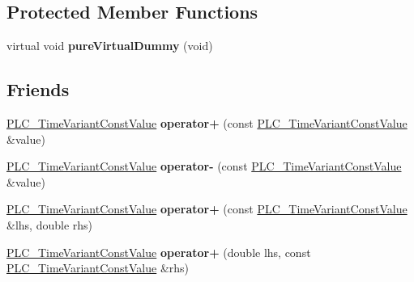 \subsection*{\-Protected \-Member \-Functions}
\begin{DoxyCompactItemize}
\item 
\hypertarget{classns3_1_1PLC__TimeVariantConstValue_a9bf67ac73617b8fe68424bbaa16216c5}{virtual void {\bfseries pure\-Virtual\-Dummy} (void)}\label{classns3_1_1PLC__TimeVariantConstValue_a9bf67ac73617b8fe68424bbaa16216c5}

\end{DoxyCompactItemize}
\subsection*{\-Friends}
\begin{DoxyCompactItemize}
\item 
\hypertarget{classns3_1_1PLC__TimeVariantConstValue_a18abf5ad9ce5544205a3df9ab595a4d3}{\hyperlink{classns3_1_1PLC__TimeVariantConstValue}{\-P\-L\-C\-\_\-\-Time\-Variant\-Const\-Value} {\bfseries operator+} (const \hyperlink{classns3_1_1PLC__TimeVariantConstValue}{\-P\-L\-C\-\_\-\-Time\-Variant\-Const\-Value} \&value)}\label{classns3_1_1PLC__TimeVariantConstValue_a18abf5ad9ce5544205a3df9ab595a4d3}

\item 
\hypertarget{classns3_1_1PLC__TimeVariantConstValue_a68bb3e707836681264d3475bdf3139d8}{\hyperlink{classns3_1_1PLC__TimeVariantConstValue}{\-P\-L\-C\-\_\-\-Time\-Variant\-Const\-Value} {\bfseries operator-\/} (const \hyperlink{classns3_1_1PLC__TimeVariantConstValue}{\-P\-L\-C\-\_\-\-Time\-Variant\-Const\-Value} \&value)}\label{classns3_1_1PLC__TimeVariantConstValue_a68bb3e707836681264d3475bdf3139d8}

\item 
\hypertarget{classns3_1_1PLC__TimeVariantConstValue_ad4f5e6208873b2f5d3d214d02e97a565}{\hyperlink{classns3_1_1PLC__TimeVariantConstValue}{\-P\-L\-C\-\_\-\-Time\-Variant\-Const\-Value} {\bfseries operator+} (const \hyperlink{classns3_1_1PLC__TimeVariantConstValue}{\-P\-L\-C\-\_\-\-Time\-Variant\-Const\-Value} \&lhs, double rhs)}\label{classns3_1_1PLC__TimeVariantConstValue_ad4f5e6208873b2f5d3d214d02e97a565}

\item 
\hypertarget{classns3_1_1PLC__TimeVariantConstValue_abe0e0c47bc8b4c83f596f059affa8b17}{\hyperlink{classns3_1_1PLC__TimeVariantConstValue}{\-P\-L\-C\-\_\-\-Time\-Variant\-Const\-Value} {\bfseries operator+} (double lhs, const \hyperlink{classns3_1_1PLC__TimeVariantConstValue}{\-P\-L\-C\-\_\-\-Time\-Variant\-Const\-Value} \&rhs)}\label{classns3_1_1PLC__TimeVariantConstValue_abe0e0c47bc8b4c83f596f059affa8b17}


\end{DoxyCompactItemize}

